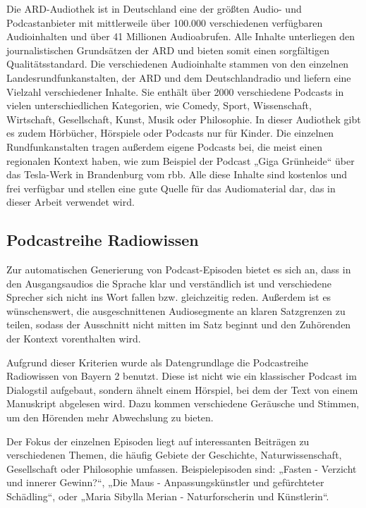 Die ARD-Audiothek ist in Deutschland eine der größten Audio- und Podcastanbieter mit mittlerweile über 100.000 verschiedenen verfügbaren Audioinhalten und über 41 Millionen Audioabrufen.
Alle Inhalte unterliegen den journalistischen Grundsätzen der ARD und bieten somit einen sorgfältigen Qualitätsstandard.
Die verschiedenen Audioinhalte stammen von den einzelnen Landesrundfunkanstalten, der ARD und dem Deutschlandradio und liefern eine Vielzahl verschiedener Inhalte.
Sie enthält über 2000 verschiedene Podcasts in vielen unterschiedlichen Kategorien, wie Comedy, Sport, Wissenschaft, Wirtschaft, Gesellschaft, Kunst, Musik oder Philosophie.
In dieser Audiothek gibt es zudem Hörbücher, Hörspiele oder Podcasts nur für Kinder.
Die einzelnen Rundfunkanstalten tragen außerdem eigene Podcasts bei, die meist einen regionalen Kontext haben, wie zum Beispiel der Podcast „Giga Grünheide“ über das Tesla-Werk in Brandenburg vom rbb.
Alle diese Inhalte sind kostenlos und frei verfügbar und stellen eine gute Quelle für das Audiomaterial dar, das in dieser Arbeit verwendet wird.

\subsection{Podcastreihe Radiowissen}

Zur automatischen Generierung von Podcast-Episoden bietet es sich an, dass in den Ausgangsaudios die Sprache klar und verständlich ist und verschiedene Sprecher sich nicht ins Wort fallen bzw. gleichzeitig reden.
Außerdem ist es wünschenswert, die ausgeschnittenen Audiosegmente an klaren Satzgrenzen zu teilen, sodass der Ausschnitt nicht mitten im Satz beginnt und den Zuhörenden der Kontext vorenthalten wird.

Aufgrund dieser Kriterien wurde als Datengrundlage die Podcastreihe Radiowissen von Bayern 2 benutzt.
Diese ist nicht wie ein klassischer Podcast im Dialogstil aufgebaut, sondern ähnelt einem Hörspiel, bei dem der Text von einem Manuskript abgelesen wird.
Dazu kommen verschiedene Geräusche und Stimmen, um den Hörenden mehr Abwechslung zu bieten.

Der Fokus der einzelnen Episoden liegt auf interessanten Beiträgen zu verschiedenen Themen, die häufig Gebiete der Geschichte, Naturwissenschaft, Gesellschaft oder Philosophie umfassen.
Beispielepisoden sind: „Fasten - Verzicht und innerer Gewinn?“, „Die Maus - Anpassungskünstler und gefürchteter Schädling“, oder „Maria Sibylla Merian - Naturforscherin und Künstlerin“.

